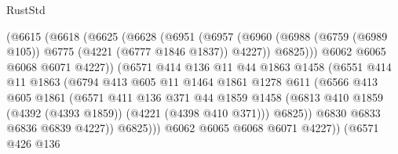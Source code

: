 \begin{lexlean}{RustStd}
\begin{coremodule}
                        (@6615
                          (@6618
                            (@6625
                              (@6628
                                (@6951
                                  (@6957
                                    (@6960
                                      (@6988
                                        (@6759 (@6989 @105))
                                        @6775
                                        (@4221 (@6777 @1846 @1837))
                                        @4227))
                                    @6825)))
                              @6062
                              @6065
                              @6068
                              @6071
                              @4227))
                          (@6571
                            @414
                            @136
                            @11
                            @44
                            @1863
                            @1458
                            (@6551
                              @414
                              @11
                              @1863
                              (@6794
                                @413
                                @605
                                @11
                                @1464
                                @1861
                                @1278
                                @611
                                (@6566
                                  @413
                                  @605
                                  @1861
                                  (@6571
                                    @411
                                    @136
                                    @371
                                    @44
                                    @1859
                                    @1458
                                    (@6813
                                      @410
                                      @1859
                                      (@4392 (@4393 @1859))
                                      (@4221 (@4398 @410 @371)))
                                    @6825))
                                @6830
                                @6833
                                @6836
                                @6839
                                @4227))
                            @6825)))
                      @6062
                      @6065
                      @6068
                      @6071
                      @4227))
                  (@6571
                    @426
                    @136

\end{coremodule}
\end{lexlean}
